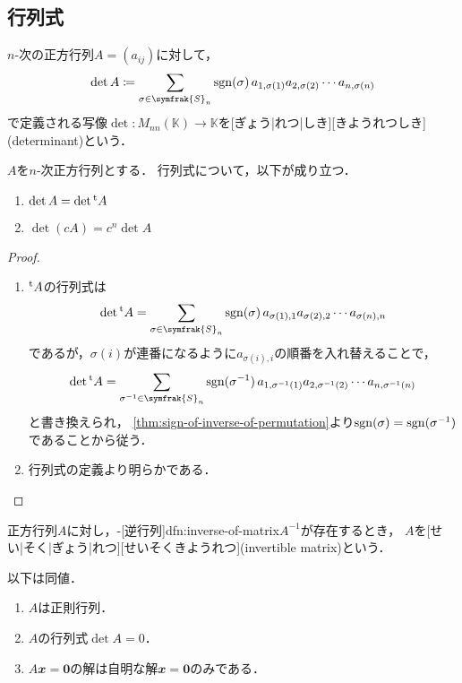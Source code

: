 \documentclass[../sotsu.tex]{subfiles}
\begin{document}
\subsection{行列式}

\begin{definition}
    $n$-次の正方行列$A = (a_{ij})$に対して，
    \begin{equation}
        \det A  \coloneq  \sum_{\sigma \in \symfrak{S}_n} \sgn(\sigma) \, a_{1, \sigma(1)} a_{2, \sigma(2)} \dotsm a_{n, \sigma(n)} 
    \end{equation}
    で定義される写像$\det \colon M_{nn}(𝕂) \to 𝕂$を[ぎょう|れつ|しき][きようれつしき](determinant)という．
\end{definition}

\begin{proposition}
    $A$を$n$-次正方行列とする．
    行列式について，以下が成り立つ．
    \begin{enumerate}
        \item $\det A = \det {}^{\mathrm{t}}A$
        \item $\det (cA) = c^n \det A$
    \end{enumerate}
\end{proposition}

\begin{proof}
    \begin{enumerate}
        \item ${}^{\mathrm{t}}A$の行列式は
            \[  \det \tp{A} = \sum_{\sigma \in \symfrak{S}_n} \sgn(\sigma) \, a_{\sigma(1), 1} a_{\sigma(2), 2} \dotsm a_{\sigma(n), n}  \]
            であるが，$\sigma(i)$が連番になるように$a_{\sigma(i), i}$の順番を入れ替えることで，
            \[  \det \tp{A} = \sum_{\sigma^{-1} \in \symfrak{S}_n} \sgn(\sigma^{-1}) \, a_{1, \sigma^{-1}(1)} a_{2, \sigma^{-1}(2)} \dotsm a_{n, \sigma^{-1}(n)}  \]
            と書き換えられ，
            \cref{thm:sign-of-inverse-of-permutation}より$\operatorname{sgn}(\sigma) = \operatorname{sgn}(\sigma^{-1})$であることから従う．
        \item 行列式の定義より明らかである．
    \end{enumerate}
\end{proof}

\begin{definition}
    \label{dfn:invertible-matrix}
    正方行列$A$に対し，-[逆行列]{dfn:inverse-of-matrix}$A^{-1}$が存在するとき，
    $A$を[せい|そく|ぎょう|れつ][せいそくきようれつ](invertible matrix)という．
\end{definition}

\begin{proposition}
    以下は同値．
    \begin{enumerate}
        \item $A$は正則行列．
        \item $A$の行列式$\det A = 0$．
        \item $A 𝒙 = \symbf{0}$の解は自明な解$𝒙 = \symbf{0}$のみである．
    \end{enumerate}
\end{proposition}
\end{document}
